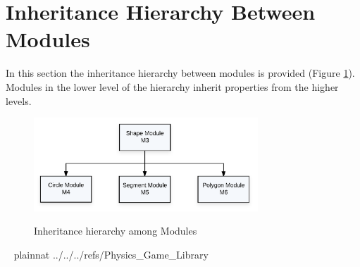 \documentclass[12pt]{article}
\newcommand{\authornote}[3]{}
\newcommand{\olu}[1]{\authornote{red}{OO}{#1}}
\begin{document}
\section{Inheritance Hierarchy Between Modules} \label{SecInheritance}
In this section the inheritance hierarchy between modules is provided (Figure \ref{Fig_Inheritance}).
Modules in the lower level of the hierarchy inherit properties from the higher levels.
\begin{figure}[htbp]
\begin{center}
{
 \includegraphics[width=0.75\textwidth]{inherit.png}
}
\caption{\label{Fig_Inheritance}Inheritance hierarchy among Modules}
\end{center}
\end{figure}
\olu{This section is not in the MG template but provides more info. aout the Shape module}
~\newpage
 {plainnat}
 {../../../refs/Physics_Game_Library}
\end{document}
